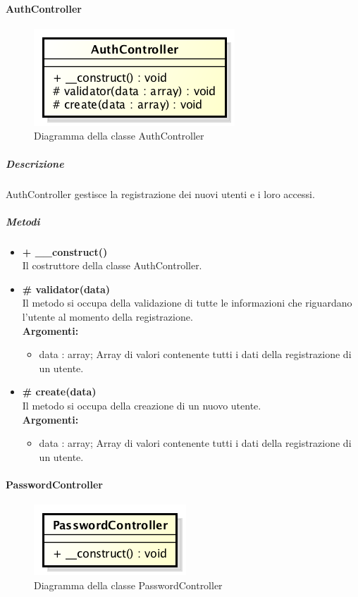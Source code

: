 	\paragraph{AuthController}
	\begin{figure}[h]
\centering
\includegraphics[width=0.5\linewidth]{img/back_end_http_controllers_authController}
\caption[Diagramma della classe AuthController]{Diagramma della classe AuthController}
\label{fig:back_end_http_controllers_authController}
\end{figure}
		\subparagraph{Descrizione}
			AuthController gestisce la registrazione dei nuovi utenti e i loro accessi.
		\subparagraph{Metodi}
			\begin{itemize}
				\item \textbf{+ \_\_construct()}\\
				Il costruttore della classe AuthController.
				\item \textbf{\# validator(data)}\\
				Il metodo si occupa della validazione di tutte le informazioni che riguardano l'utente al momento della registrazione.\\
					\textbf{Argomenti:}
						\begin{itemize}
							\item data : array;
							Array di valori contenente tutti i dati della registrazione di un utente. 
						\end{itemize}
				\item \textbf{\# create(data)}\\
				Il metodo si occupa della creazione di un nuovo utente.\\
					\textbf{Argomenti:}
						\begin{itemize}
							\item data : array;
							Array di valori contenente tutti i dati della registrazione di un utente.
						\end{itemize}
			\end{itemize}
			
	\paragraph{PasswordController}
	\begin{figure}[h]
\centering
\includegraphics[width=0.5\linewidth]{img/back_end_http_controllers_passwordController}
\caption[Diagramma della classe PasswordController]{Diagramma della classe PasswordController}
\label{fig:back_end_http_controllers_passwordController}
\end{figure}

